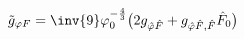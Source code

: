 \begin{equation}
  \label{eq:gphiF}
  \tilde{g}_{\varphi F} = \inv{9} \varphi_0^{-\frac{4}{3}} \bigl( 2 g_{\hat{\varphi} \hat{F}} + g_{\hat{\varphi} \hat{F},
    \hat{F}} \hat{F}_0 \bigr)
\end{equation}

